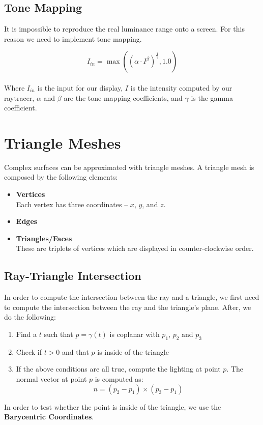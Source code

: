 \documentclass{article}
\begin{document}
\subsection{Tone Mapping}
It is impossible to reproduce the real luminance range onto a screen. For this reason we need to implement tone mapping.

\[ I_{in} = \max((\alpha \cdot I^\beta)^{\frac{1}{\gamma}}, 1.0) \] \\
Where $I_{in}$ is the input for our display, $I$ is the intensity computed by our raytracer, $\alpha$ and $\beta$ are the tone mapping coefficients, and $\gamma$ is the gamma coefficient.

\section{Triangle Meshes}
Complex surfaces can be approximated with triangle meshes. A triangle mesh is composed by the following elements:

\begin{itemize}
	\item \textbf{Vertices}
	\vspace{.2cm} \\
	Each vertex has three coordinates -- $x$, $y$, and $z$.
	
	\item \textbf{Edges}
	\item \textbf{Triangles/Faces}
	\vspace{.2cm} \\
	These are triplets of vertices which are displayed in counter-clockwise order.
\end{itemize}

\subsection{Ray-Triangle Intersection}
In order to compute the intersection between the ray and a triangle, we first need to compute the intersection between the ray and the triangle's plane. After, we do the following:

\begin{enumerate}
	\item Find a $t$ such that $p = \gamma(t)$ is coplanar with $p_1$, $p_2$ and $p_3$
	\item Check if $t > 0$ and that $p$ is inside of the triangle
	\item If the above conditions are all true, compute the lighting at point $p$. The normal vector at point $p$ is computed as:
	\[ n = (p_2 - p_1) \times (p_3 - p_1) \]
\end{enumerate}
In order to test whether the point is inside of the triangle, we use the \textbf{Barycentric Coordinates}.
\end{document}
